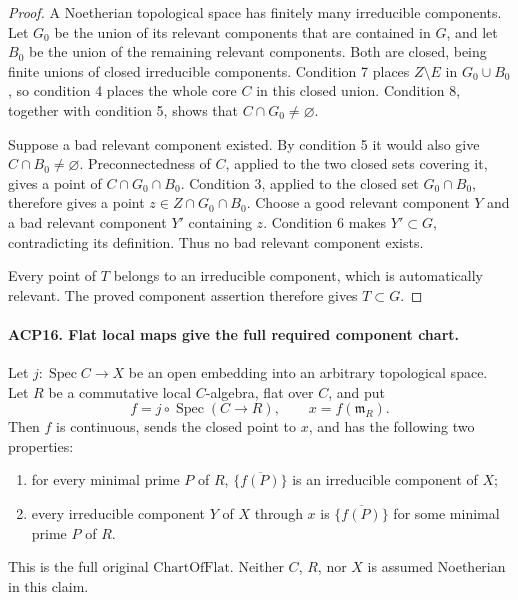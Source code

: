 \documentclass[11pt,a4paper]{article}
\numberwithin{equation}{section}
\theoremstyle{remark}\newtheorem{remark}[theorem]{Remark}
\begin{document}
\begin{proof}
A Noetherian topological space has finitely many irreducible
components.  Let \(G_0\) be the union of its relevant
components that are contained in \(G\), and let \(B_0\) be
the union of the remaining relevant components.  Both are
closed, being finite unions of closed irreducible components.
Condition 7 places \(Z\setminus E\) in \(G_0\cup B_0\),
so condition 4 places the whole core \(C\) in this closed
union.  Condition 8, together with condition 5, shows that
\(C\cap G_0\ne\varnothing\).

Suppose a bad relevant component existed.  By condition 5
it would also give \(C\cap B_0\ne\varnothing\).
Preconnectedness of \(C\), applied to the two closed sets
covering it, gives a point of \(C\cap G_0\cap B_0\).
Condition 3, applied to the closed set \(G_0\cap B_0\),
therefore gives a point \(z\in Z\cap G_0\cap B_0\).
Choose a good relevant component \(Y\) and a bad relevant
component \(Y'\) containing \(z\).  Condition 6 makes
\(Y'\subset G\), contradicting its definition.
Thus no bad relevant component exists.

Every point of \(T\) belongs to an irreducible component,
which is automatically relevant.  The proved component
assertion therefore gives \(T\subset G\).
\end{proof}

\paragraph{ACP16. Flat local maps give the full required component chart.}
\label{claim:ACP16}
Let \(j:\operatorname{Spec}C\to X\) be an open embedding
into an arbitrary topological space.  Let \(R\) be a
commutative local \(C\)-algebra, flat over \(C\), and put
\[
 f=j\circ\operatorname{Spec}(C\to R),
 \qquad x=f(\mathfrak m_R).
\]
Then \(f\) is continuous, sends the closed point to \(x\),
and has the following two properties:
\begin{enumerate}
\item for every minimal prime \(P\) of \(R\),
      \(\overline{\{f(P)\}}\) is an irreducible component of \(X\);
\item every irreducible component \(Y\) of \(X\) through \(x\)
      is \(\overline{\{f(P)\}}\) for some minimal prime \(P\) of \(R\).
\end{enumerate}
This is the full original \(\mathrm{ChartOfFlat}\).  Neither
\(C\), \(R\), nor \(X\) is assumed Noetherian in this claim.
\end{document}
